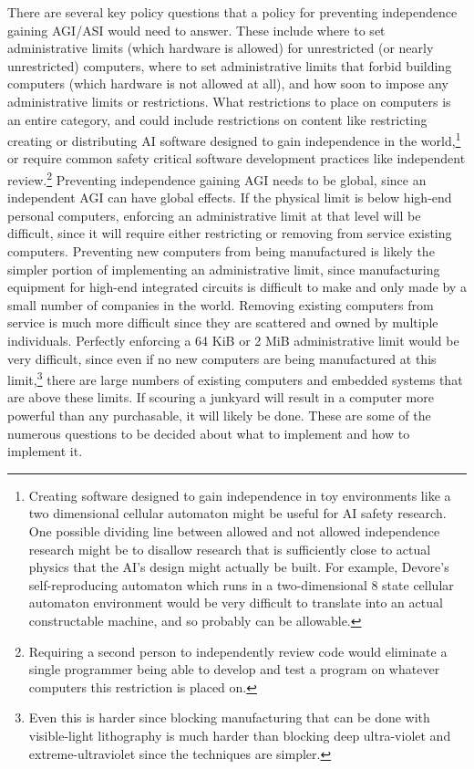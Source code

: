 \documentclass[letterpaper,twocolumn]{article}
\begin{document}
There are several key policy questions that a policy for preventing
independence gaining AGI/ASI would need to answer. These include where
to set administrative limits (which hardware is allowed) for
unrestricted (or nearly unrestricted) computers, where to set
administrative limits that forbid building computers (which hardware
is not allowed at all), and how soon to impose any administrative
limits or restrictions. What restrictions to place on computers is an
entire category, and could include restrictions on content like
restricting creating or distributing AI software designed to gain
independence in the world,\footnote{Creating software designed to gain
independence in toy environments like a two dimensional cellular
automaton might be useful for AI safety research. One possible
dividing line between allowed and not allowed independence research
might be to disallow research that is sufficiently close to actual
physics that the AI's design might actually be built.  For example,
Devore's self-reproducing automaton which runs in a two-dimensional 8
state cellular automaton environment would be very difficult to
translate into an actual constructable machine, and so probably can
be allowable.} or require common safety critical software development
practices like independent review.\footnote{Requiring a second person
to independently review code would eliminate a single programmer being
able to develop and test a program on whatever computers this
restriction is placed on.}  Preventing independence gaining AGI needs
to be global, since an independent AGI can have global effects. If the
physical limit is below high-end personal computers, enforcing an
administrative limit at that level will be difficult, since it will
require either restricting or removing from service existing
computers. Preventing new computers from being manufactured is likely
the simpler portion of implementing an administrative limit, since
manufacturing equipment for high-end integrated circuits is difficult
to make and only made by a small number of companies in the
world. Removing existing computers from service is much more difficult
since they are scattered and owned by multiple individuals. Perfectly
enforcing a 64 KiB or 2 MiB administrative limit would be very
difficult, since even if no new computers are being manufactured at
this limit,\footnote{Even this is harder since blocking manufacturing
that can be done with visible-light lithography is much harder than
blocking deep ultra-violet and extreme-ultraviolet since the
techniques are simpler.} there are large numbers of existing computers
and embedded systems that are above these limits. If scouring a
junkyard will result in a computer more powerful than any purchasable,
it will likely be done. These are some of the numerous questions to be
decided about what to implement and how to implement it.
\end{document}
